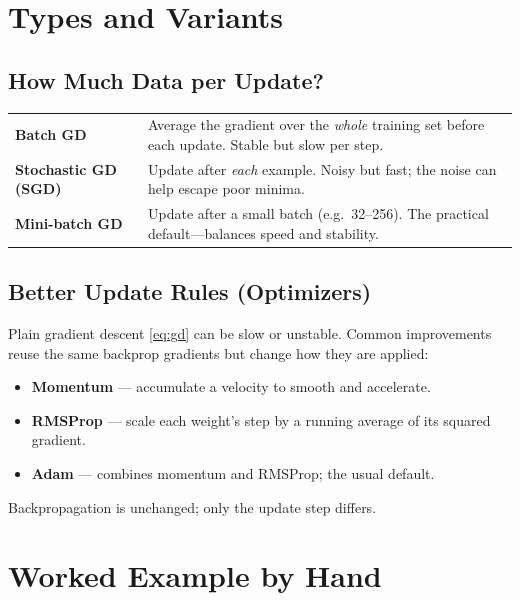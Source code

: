 \documentclass[11pt,a4paper]{report}
\theoremstyle{definition}
\theoremstyle{remark}
\begin{document}
\chapter{Types and Variants}

\section{How Much Data per Update?}
\begin{center}
\begin{tabular}{@{}p{4.1cm}p{9.0cm}@{}}
\toprule
\textbf{Batch GD} & Average the gradient over the \emph{whole} training set
before each update. Stable but slow per step.\\
\textbf{Stochastic GD (SGD)} & Update after \emph{each} example. Noisy but fast;
the noise can help escape poor minima.\\
\textbf{Mini-batch GD} & Update after a small batch (e.g.\ 32--256). The
practical default---balances speed and stability.\\
\bottomrule
\end{tabular}
\end{center}

\section{Better Update Rules (Optimizers)}
Plain gradient descent \eqref{eq:gd} can be slow or unstable. Common
improvements reuse the same backprop gradients but change how they are applied:
\begin{itemize}[nosep]
  \item \textbf{Momentum} --- accumulate a velocity to smooth and accelerate.
  \item \textbf{RMSProp} --- scale each weight's step by a running average of its
        squared gradient.
  \item \textbf{Adam} --- combines momentum and RMSProp; the usual default.
\end{itemize}
Backpropagation is unchanged; only the update step differs.

\chapter{Worked Example by Hand}
\label{ch:worked}
\end{document}
